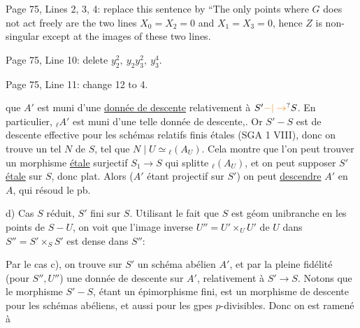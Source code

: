Page 75, Lines 2, 3, 4: replace this sentence by ``The only points where $G$ does not act freely are the two lines $X_0=X_2=0$ and $X_1=X_3=0$, hence $Z$ is non-singular except at the images of these two lines.

Page 75, Line 10: delete $y_2^2,\ y_2 y_3^2,\ y_3^4$.

Page 75, Line 11: change 12 to 4.


que $A'$ est muni d'une \uline{donnée de descente} relativement à $S'\unsure{-|\to}S$. En particulier,  $ {}_{\ell}A'$ est muni d'une telle donnée de descente,.   Or $S'-S$ est  de descente effective pour les schémas relatifs finis étales (SGA 1 VIII), donc on trouve un  tel    $N$ de $S$, tel que $N\mid U\simeq{}_{\ell}(A_U)$. Cela montre que l'on peut trouver un morphisme  \uline{étale} surjectif $S_1\to S$ qui splitte $ {}_{\ell}(A_U)$,  et on peut supposer $S'$  \uline{étale} sur $S$, donc plat. Alors ($A'$ étant projectif sur $S'$) on  peut \uline{descendre} $A'$ en $A$, qui résoud le pb.

d) Cas $S$ réduit,  $S'$ fini sur $S$. Utilisant le fait que $S$ est géom unibranche en les points de $S-U$, on voit que l'image inverse $U''=U'\times_U U'$ de $U$ dans $S''=S'\times_S S'$ est dense dans $S''$: 


Par le cas c), on trouve sur $S'$ un schéma abélien $A'$, et par la pleine fidélité (pour $S'',U''$) une donnée de descente sur $A'$, relativement à $S'\to S$. Notons que le morphisme $S'-S$, étant un épimorphisme fini, est un morphisme de descente pour les schémas abéliens,  et aussi pour les gpes $p$-divisibles. Donc on est ramené à

